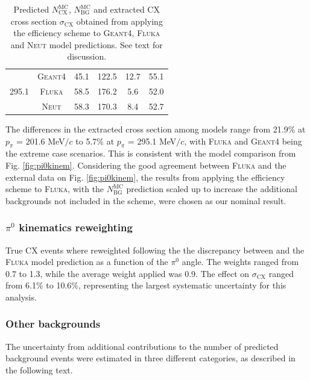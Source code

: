\begin{table}[htbp]
\begin{center}
\begin{tabular}{c|c|c|c|c|c}
\multirow{4}{*}{295.1} %
& \textsc{Geant4} & 45.1 & 122.5 & 12.7 & 55.1 \\
& \textsc{Fluka} & 58.5 & 176.2 & 5.6 & 52.0 \\
& \textsc{Neut} & 58.3 & 170.3 & 8.4 & 52.7 \\ \hline
\end{tabular}
\caption{Predicted $N_{\mathrm{CX}}^{\mathrm{MC}}$, $N_{\mathrm{BG}}^{\mathrm{MC}}$ and extracted CX cross section $\sigma_{\mathrm{CX}}$ obtained from applying the efficiency scheme to \textsc{Geant4}, \textsc{Fluka} and \textsc{Neut} model predictions. See text for discussion.}
\label{tbl:eff_scheme_results}
\end{center}
\end{table}

The differences in the extracted cross section among models range from 21.9\% at $p_{\pi}$ = 201.6 MeV$/c$ to 5.7\% at $p_{\pi}$ = 295.1 MeV$/c$, with \textsc{Fluka} and \textsc{Geant4} being the extreme case scenarios. This is consistent with the model comparison from Fig. \ref{fig:pi0kinem}. Considering the good agreement between \textsc{Fluka} and the external data on Fig. \ref{fig:pi0kinem}, the results from applying the efficiency scheme to \textsc{Fluka}, with the $N_{\mathrm{BG}}^{\mathrm{MC}}$ prediction scaled up to increase the additional backgrounds not included in the scheme, were chosen as our nominal result.

\subsubsection{\bf{$\pi^{0}$ kinematics reweighting}}
True CX events where reweighted following the the discrepancy between \cite{Ashery2} and the \textsc{Fluka} model prediction as a function of the $\pi^{0}$ angle. The weights ranged from 0.7 to 1.3, while the average weight applied was 0.9. The effect on $\sigma_{\mathrm{CX}}$ ranged  from 6.1\% to 10.6\%, representing the largest systematic uncertainty for this analysis.

\subsubsection{\bf Other backgrounds}\label{sec:background}
The uncertainty from additional contributions to the number of predicted background events were estimated in three different categories, as described in the following text.

